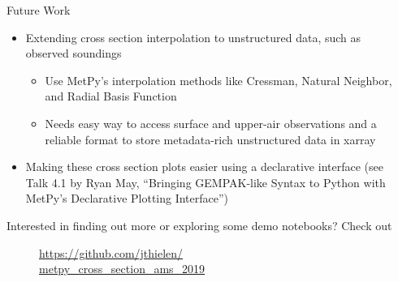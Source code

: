 \documentclass[final]{beamer}
\newlength{\sepwidth}
\newlength{\colwidth}
\newcommand{\separatorcolumn}{\begin{column}{\sepwidth}\end{column}}
\begin{document}
\begin{frame}[t, fragile]
\begin{columns}[t]
\begin{column}{\colwidth}
  \begin{block}{Future Work}

    \begin{itemize}
      \item Extending cross section interpolation to unstructured data, such as observed soundings
        \begin{itemize}
          \item Use MetPy's interpolation methods like Cressman, Natural Neighbor, and Radial Basis Function
          \item Needs easy way to access surface and upper-air observations and a reliable format to store metadata-rich unstructured data in xarray
        \end{itemize}
      \item Making these cross section plots easier using a declarative interface (see Talk 4.1 by Ryan May, ``Bringing GEMPAK-like Syntax to Python with MetPy's Declarative Plotting Interface'')
    \end{itemize}

  \end{block}

  \begin{exampleblock}

    Interested in finding out more or exploring some demo notebooks? Check out

    \vspace{1em} 

    \begin{figure}
      \centering
      \large{\url{https://github.com/jthielen/}\\ \url{metpy_cross_section_ams_2019}}

      \vspace{1em}

    \end{figure}

  \end{exampleblock}

\end{column}

\separatorcolumn
\end{columns}
\end{frame}
\end{document}
